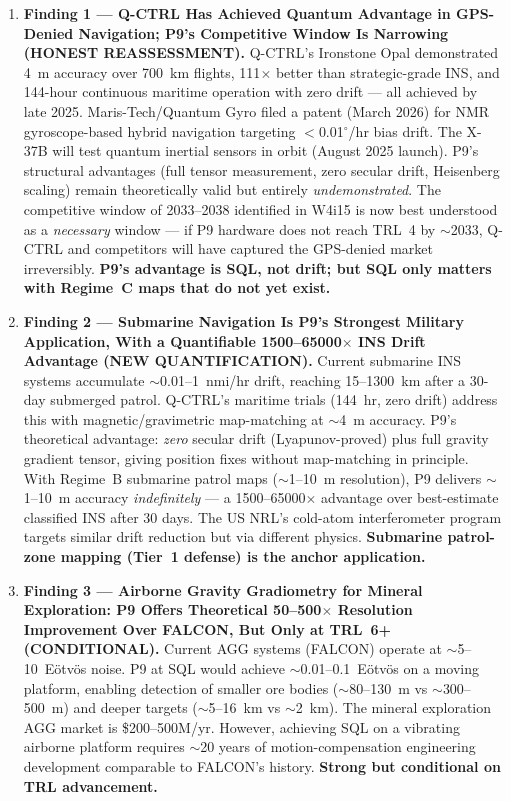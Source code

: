 \documentclass[11pt]{article}
\theoremstyle{definition}
\theoremstyle{remark}
\begin{document}
\begin{enumerate}
\item \textbf{Finding 1 --- Q-CTRL Has Achieved Quantum Advantage in GPS-Denied
  Navigation; P9's Competitive Window Is Narrowing (HONEST REASSESSMENT).}
  Q-CTRL's Ironstone Opal demonstrated 4~m accuracy over 700~km flights,
  111$\times$ better than strategic-grade INS, and 144-hour continuous
  maritime operation with zero drift --- all achieved by late 2025.
  Maris-Tech/Quantum Gyro filed a patent (March 2026) for NMR gyroscope-based
  hybrid navigation targeting $<$0.01$^\circ$/hr bias drift.
  The X-37B will test quantum inertial sensors in orbit (August 2025 launch).
  P9's structural advantages (full tensor measurement, zero secular drift,
  Heisenberg scaling) remain theoretically valid but entirely
  \emph{undemonstrated}. The competitive window of 2033--2038 identified
  in W4i15 is now best understood as a \emph{necessary} window ---
  if P9 hardware does not reach TRL~4 by $\sim$2033, Q-CTRL and
  competitors will have captured the GPS-denied market irreversibly.
  \textbf{P9's advantage is SQL, not drift; but SQL only matters with
  Regime~C maps that do not yet exist.}

\item \textbf{Finding 2 --- Submarine Navigation Is P9's Strongest
  Military Application, With a Quantifiable 1500--65000$\times$ INS
  Drift Advantage (NEW QUANTIFICATION).}
  Current submarine INS systems accumulate $\sim$0.01--1~nmi/hr drift,
  reaching 15--1300~km after a 30-day submerged patrol. Q-CTRL's maritime
  trials (144~hr, zero drift) address this with magnetic/gravimetric
  map-matching at $\sim$4~m accuracy.
  P9's theoretical advantage: \emph{zero} secular drift (Lyapunov-proved)
  plus full gravity gradient tensor, giving position fixes without
  map-matching in principle. With Regime~B submarine patrol maps
  ($\sim$1--10~m resolution), P9 delivers $\sim$1--10~m accuracy
  \emph{indefinitely} --- a 1500--65000$\times$ advantage over
  best-estimate classified INS after 30 days.
  The US NRL's cold-atom interferometer program targets similar
  drift reduction but via different physics.
  \textbf{Submarine patrol-zone mapping (Tier~1 defense) is the
  anchor application.}

\item \textbf{Finding 3 --- Airborne Gravity Gradiometry for Mineral
  Exploration: P9 Offers Theoretical 50--500$\times$ Resolution
  Improvement Over FALCON, But Only at TRL~6+ (CONDITIONAL).}
  Current AGG systems (FALCON) operate at $\sim$5--10~E\"otv\"os noise.
  P9 at SQL would achieve $\sim$0.01--0.1~E\"otv\"os on a moving platform,
  enabling detection of smaller ore bodies ($\sim$80--130~m vs $\sim$300--500~m)
  and deeper targets ($\sim$5--16~km vs $\sim$2~km). The mineral exploration
  AGG market is \$200--500M/yr. However, achieving SQL on a vibrating
  airborne platform requires $\sim$20 years of motion-compensation
  engineering development comparable to FALCON's history.
  \textbf{Strong but conditional on TRL advancement.}


\end{enumerate}
\end{document}
